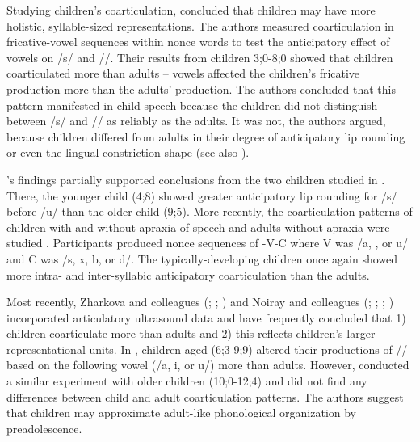 \documentclass[a4paper,man,floatsintext,natbib,donotrepeattitle, apacite]{apa6}
\begin{document}
Studying children's coarticulation, \citet{nittrouerEmergencePhoneticSegments1989} concluded that children may have more holistic, syllable-sized representations. The authors measured coarticulation in fricative-vowel sequences within nonce words to test the anticipatory effect of vowels on /s/ and /\textesh/. Their results from children 3;0-8;0 showed that children coarticulated more than adults – vowels affected the children's fricative production more than the adults' production. The authors concluded that this pattern manifested in child speech because the children did not distinguish between /s/ and /\textesh/ as reliably as the adults. It was not, the authors argued, because children differed from adults in their degree of anticipatory lip rounding or even the lingual constriction shape (see also \citealt{nittrouerHowChildrenLearn1996}).

\citet{nittrouerEmergencePhoneticSegments1989}'s findings partially supported conclusions from the two children studied in \citet{reppObservationsDevelopmentAnticipatory1986}. There, the younger child (4;8) showed greater anticipatory lip rounding for /s/ before /u/ than the older child (9;5). More recently, the coarticulation patterns of children with and without apraxia of speech and adults without apraxia were studied \citep{nijlandCoarticulationPatternsChildren2002}. Participants produced nonce sequences of \textschwa-V-C where V was /a, \textsci, or u/ and C was /s, x, b, or d/. The typically-developing children once again showed more intra- and inter-syllabic anticipatory coarticulation than the adults.

Most recently, Zharkova and colleagues (\citealt{zharkovaCoarticulationIndicatorSpeech2011}; \citealt{zharkovaSpatialTemporalLingual2014}; \citealt{zharkovaDynamicsVoicelessSibilant2018}) and Noiray and colleagues (\citealt{rubertusDevelopmentGesturalOrganization2018};
\citealt{noirayBackFutureNonlinear2019};
\citealt{noirayHowChildrenOrganize2018}; 
\citealt{noirayHowChildrenOrganize2018}) incorporated articulatory ultrasound data and have frequently concluded that 1) children coarticulate more than adults and 2) this reflects children's larger representational units. In \citet{zharkovaCoarticulationIndicatorSpeech2011}, children aged (6;3-9;9) altered their productions of /\textesh/ based on the following vowel (/a, i, or u/) more than adults. However, \citet{zharkovaSpatialTemporalLingual2014} conducted a similar experiment with older children (10;0-12;4) and did not find any differences between child and adult coarticulation patterns. The authors suggest that children may approximate adult-like phonological organization by preadolescence. 
\end{document}
